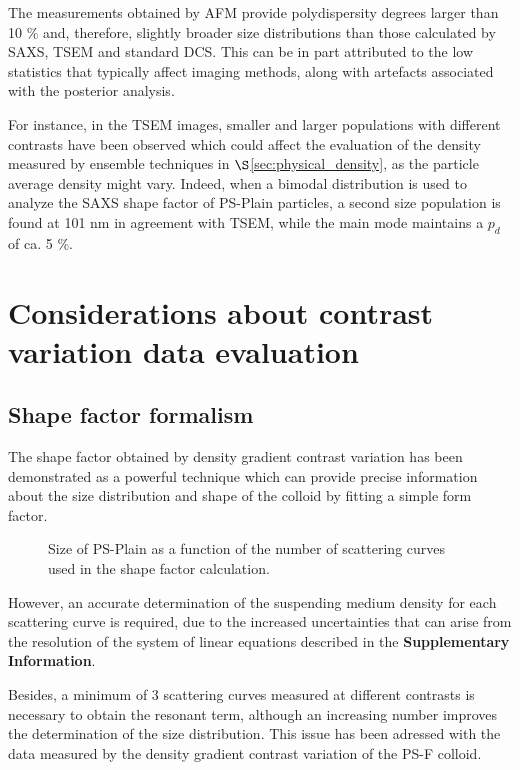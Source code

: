 The measurements obtained by AFM provide polydispersity degrees larger than 10 $\%$\citep{nicolet_inter-laboratory_2016} and, therefore, slightly broader size distributions than those calculated by SAXS, TSEM and standard DCS. This can be in part attributed to the low statistics that typically affect imaging methods, along with artefacts associated with the posterior analysis.

For instance, in the TSEM images\citep{nicolet_inter-laboratory_2016}, smaller and larger populations with different contrasts have been observed which could affect the evaluation of the density measured by ensemble techniques in $\S$\ref{sec:physical_density}, as the particle average density might vary. Indeed, when a bimodal distribution is used to analyze the SAXS shape factor of PS-Plain particles, a second size population is found at 101 nm in agreement with TSEM, while the main mode maintains a $p_d$ of ca. 5 $\%$.

\section{Considerations about contrast variation data evaluation}
\subsection{Shape factor formalism}
The shape factor obtained by density gradient contrast variation has been demonstrated as a powerful technique which can provide precise information about the size distribution and shape of the colloid by fitting a simple form factor.

\begin{figure}
	\begin{center}
		
	\end{center}
\caption{Size of PS-Plain as a function of the number of scattering curves used in the shape factor calculation.}
\label{fig:ResonantTermSimulationNumber}
\end{figure}

However, an accurate determination of the suspending medium density for each scattering curve is required, due to the increased uncertainties\cite{lefebvre_propagation_2000} that can arise from the resolution of the system of linear equations described in the \textbf{Supplementary Information}.

Besides, a minimum of 3 scattering curves measured at different contrasts is necessary to obtain the resonant term, although an increasing number improves the determination of the size distribution. This issue has been adressed with the data measured by the density gradient contrast variation of the PS-F colloid. 


